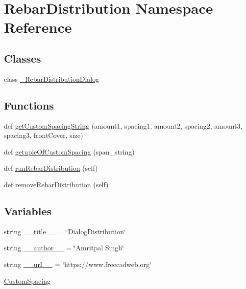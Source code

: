 \hypertarget{namespaceRebarDistribution}{}\section{Rebar\+Distribution Namespace Reference}
\label{namespaceRebarDistribution}
\subsection*{Classes}
\begin{DoxyCompactItemize}
\item 
class \hyperlink{classRebarDistribution_1_1__RebarDistributionDialog}{\+\_\+\+Rebar\+Distribution\+Dialog}
\end{DoxyCompactItemize}
\subsection*{Functions}
\begin{DoxyCompactItemize}
\item 
def \hyperlink{namespaceRebarDistribution_a22a12f260218752c4099cf68e4e3da5c}{get\+Custom\+Spacing\+String} (amount1, spacing1, amount2, spacing2, amount3, spacing3, front\+Cover, size)
\item 
def \hyperlink{namespaceRebarDistribution_a59ac567a8536ea3b5e7a9900a898e0c0}{getuple\+Of\+Custom\+Spacing} (span\+\_\+string)
\item 
def \hyperlink{namespaceRebarDistribution_aa547df5cb10d2e64eaa0b51c445fa30b}{run\+Rebar\+Distribution} (self)
\item 
def \hyperlink{namespaceRebarDistribution_a85270a1b6e8c782a9e0ba54add518f2a}{remove\+Rebar\+Distribution} (self)
\end{DoxyCompactItemize}
\subsection*{Variables}
\begin{DoxyCompactItemize}
\item 
string \hyperlink{namespaceRebarDistribution_a38609d6513215400fb6b4c0d1b7f2040}{\+\_\+\+\_\+title\+\_\+\+\_\+} = \char`\"{}Dialog\+Distribution\char`\"{}
\item 
string \hyperlink{namespaceRebarDistribution_a7bd0602448fa39ff800847e313ca8b25}{\+\_\+\+\_\+author\+\_\+\+\_\+} = \char`\"{}Amritpal Singh\char`\"{}
\item 
string \hyperlink{namespaceRebarDistribution_a61d261a603c7a127f83af9b7516547c5}{\+\_\+\+\_\+url\+\_\+\+\_\+} = \char`\"{}https\+://www.\+freecadweb.\+org\char`\"{}
\item 
\hyperlink{namespaceRebarDistribution_a6572ac63b9c553f99eeb53e19f7b4e7c}{Custom\+Spacing}
\end{DoxyCompactItemize}



